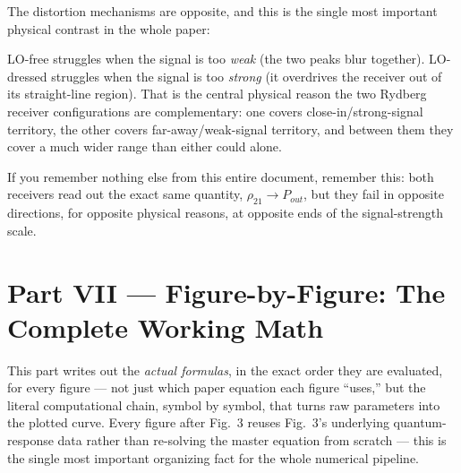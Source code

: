 \documentclass[11pt]{article}
\begin{document}
The distortion mechanisms are opposite, and this is the single most important physical contrast in the whole paper:
\begin{center}

\medskip
{}
\end{center}

\begin{plain}
LO-free struggles when the signal is too \emph{weak} (the two peaks blur together). LO-dressed struggles when the signal is too \emph{strong} (it overdrives the receiver out of its straight-line region). That is the central physical reason the two Rydberg receiver configurations are complementary: one covers close-in/strong-signal territory, the other covers far-away/weak-signal territory, and between them they cover a much wider range than either could alone.
\end{plain}
\begin{takeaway}
If you remember nothing else from this entire document, remember this: both receivers read out the exact same quantity, $\rho_{21}\to P_{out}$, but they fail in opposite directions, for opposite physical reasons, at opposite ends of the signal-strength scale.
\end{takeaway}

\newpage
\section{Part VII --- Figure-by-Figure: The Complete Working Math}
This part writes out the \emph{actual formulas}, in the exact order they are evaluated, for every figure --- not just which paper equation each figure ``uses,'' but the literal computational chain, symbol by symbol, that turns raw parameters into the plotted curve. Every figure after Fig.~3 reuses Fig.~3's underlying quantum-response data rather than re-solving the master equation from scratch --- this is the single most important organizing fact for the whole numerical pipeline.
\end{document}
